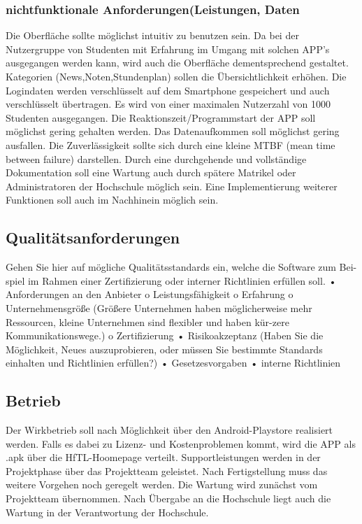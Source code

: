 \subsubsection{\textbf{nichtfunktionale Anforderungen(Leistungen, Daten}}

Die Oberfläche sollte möglichst intuitiv zu benutzen sein. Da bei der Nutzergruppe von Studenten mit Erfahrung im Umgang mit solchen APP's ausgegangen werden kann, wird auch die Oberfläche dementsprechend gestaltet.
Kategorien (News,Noten,Stundenplan) sollen die Übersichtlichkeit erhöhen.
Die Logindaten werden verschlüsselt auf dem Smartphone gespeichert und auch verschlüsselt übertragen.
Es wird von einer maximalen Nutzerzahl von 1000 Studenten ausgegangen.
Die Reaktionszeit/Programmstart der APP soll möglichst gering gehalten werden.
Das Datenaufkommen soll möglichst gering ausfallen.
Die Zuverlässigkeit sollte sich durch eine kleine MTBF (mean time between failure) darstellen.
Durch eine durchgehende und vollständige Dokumentation soll eine Wartung auch durch spätere Matrikel oder Administratoren der Hochschule möglich sein.
Eine Implementierung weiterer Funktionen soll auch im Nachhinein möglich sein.

\subsection{Qualitätsanforderungen}

Gehen Sie hier auf mögliche Qualitätsstandards ein, welche die Software zum Bei-spiel im Rahmen einer Zertifizierung oder interner Richtlinien erfüllen soll. 
•	Anforderungen an den Anbieter 
o	Leistungsfähigkeit
o	Erfahrung
o	Unternehmensgröße (Größere Unternehmen haben möglicherweise mehr Ressourcen, kleine Unternehmen sind flexibler und haben kür-zere Kommunikationswege.)
o	Zertifizierung
•	Risikoakzeptanz (Haben Sie die Möglichkeit, Neues auszuprobieren, oder müssen Sie bestimmte Standards einhalten und Richtlinien erfüllen?) 
•	Gesetzesvorgaben
•	interne Richtlinien

\subsection{Betrieb}

Der Wirkbetrieb soll nach Möglichkeit über den Android-Playstore realisiert werden. Falls es dabei zu Lizenz- und Kostenproblemen kommt, wird die APP als .apk über die HfTL-Hoomepage verteilt.
Supportleistungen werden in der Projektphase über das Projektteam geleistet. Nach Fertigstellung muss das weitere Vorgehen noch geregelt werden. Die Wartung wird zunächst vom Projektteam übernommen. Nach Übergabe an die Hochschule liegt auch die Wartung in der Verantwortung der Hochschule.

